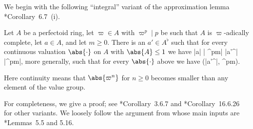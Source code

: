 





We begin with the following ``integral'' variant of the approximation lemma \cite{Sch12}*{Corollary~6.7~(i)}. %

\blem \label{approx-lem}
Let $A$ be a perfectoid ring, let $\varpi \in A$ with $\varpi^p \mid p$ be such that $A$ is $\varpi$-adically complete, let $a \in A$, and let $m \ge 0$. There is an $a' \in A^\flat$ %
such that for every continuous valuation $\abs{\cdot}$ on  $A$  with $\abs{A} \le 1$ we have
\be \label{eqn:AL-prel}
|a| \le | \varpi^{pm}|   |a'^\sharp| \le |\varpi^{pm}|,
\ee
more generally, such that for every $\abs{ \cdot}$ above we have
\be \label{AL-eq}
\tst {} \le {} \cdot \max(|a'^\sharp|, \abs{\varpi}^{pm}).
\ee
\elem

Here continuity means that $\abs{\varpi^n}$ for $n \ge 0$ becomes smaller than any element of the value group.

\bpf
For completeness, we give a proof; see \cite{KL15}*{Corollary~3.6.7} and \cite{GR18}*{Corollary~16.6.26} for other variants. We loosely follow the argument from \cite{KL15} whose main inputs are \cite{Ked13}*{Lemmas~5.5 and 5.16}.

